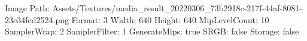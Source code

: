Image Path: Assets/Textures/media_result_20220306_73b2918c-217f-44af-8081-23c34fcd2524.png
Format: 3
Width: 640
Height: 640
MipLevelCount: 10
SamplerWrap: 2
SamplerFilter: 1
GenerateMips: true
SRGB: false
Storage: false